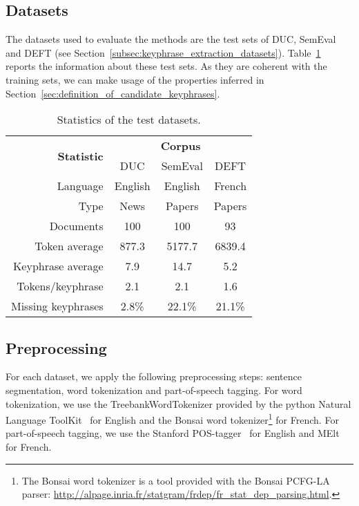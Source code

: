   \subsection{Datasets}
  \label{subsec:datasets}
    The datasets used to evaluate the methods are the test sets of DUC,
    SemEval and DEFT (see Section~\ref{subsec:keyphrase_extraction_datasets}).
    Table~\ref{tab:test_dataset_statistics} reports the information about these
    test sets. As they are coherent with the training sets, we can make usage of
    the properties inferred in
    Section~\ref{sec:definition_of_candidate_keyphrases}.
    \begin{table}
      \centering
      \begin{tabular}{@{~}r@{~}c@{~}c@{~}c@{~}}
        \toprule
        \multirow{2}{*}[-2pt]{\textbf{Statistic}} & \multicolumn{3}{c}{\textbf{Corpus}}\\
        \cmidrule{2-4}
        & DUC & SemEval & DEFT\\
        \midrule
        Language & English & English & French\\
        Type & News & Papers & Papers\\
        Documents & 100 & 100 & 93\\
        Token average & 877.3 & 5177.7 & 6839.4\\
        Keyphrase average & 7.9 & 14.7 & 5.2\\
        Tokens/keyphrase & 2.1 & 2.1 & 1.6\\
        Missing keyphrases & 2.8\% & 22.1\% & 21.1\% \\
        \bottomrule
      \end{tabular}
      \caption{Statistics of the test datasets.
               \label{tab:test_dataset_statistics}}
    \end{table}

  \subsection{Preprocessing}
  \label{subsec:preprocessing}
    For each dataset, we apply the following preprocessing steps: sentence
    segmentation, word tokenization and part-of-speech tagging. For word
    tokenization, we use the TreebankWordTokenizer provided by the python
    Natural Language ToolKit~\cite{bird2009nltk} for English and the Bonsai word
    tokenizer\footnote{The Bonsai word tokenizer is a tool provided with the
    Bonsai PCFG-LA parser:
    \url{http://alpage.inria.fr/statgram/frdep/fr_stat_dep_parsing.html}.} for
    French. For part-of-speech tagging, we use the Stanford
    POS-tagger~\cite{toutanova2003stanfordpostagger} for English and
    MElt~\cite{denis2009melt} for French.

